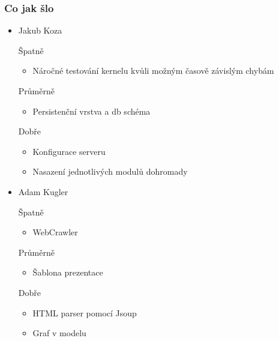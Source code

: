 \documentclass{beamer}
\begin{document}
\begin{frame}[allowframebreaks]\frametitle{Co jak šlo}
  \begin{itemize}
    \item Jakub Koza
     \begin{block}{Špatně} %
       \begin{itemize}
        \item Náročné testování kernelu kvůli možným časově závislým chybám
       \end{itemize}
     \end{block}
     \begin{block}{Průměrně} %
        \begin{itemize}
        \item Persistenční vrstva a db schéma
       \end{itemize}
     \end{block}
     \begin{block}{Dobře} %
       \begin{itemize}
        \item Konfigurace serveru
        \item Nasazení jednotlivých modulů dohromady
       \end{itemize}
     \end{block}
   
    \item Adam Kugler
      \begin{block}{Špatně} %
       \begin{itemize}
        \item WebCrawler
       \end{itemize}
     \end{block}
     \begin{block}{Průměrně} %
        \begin{itemize}
        \item Šablona prezentace
       \end{itemize}
     \end{block}
     \begin{block}{Dobře} %
       \begin{itemize}
        \item HTML parser pomocí Jsoup
        \item Graf v modelu
       \end{itemize}
     \end{block}
  

\end{itemize}
\end{frame}
\end{document}
